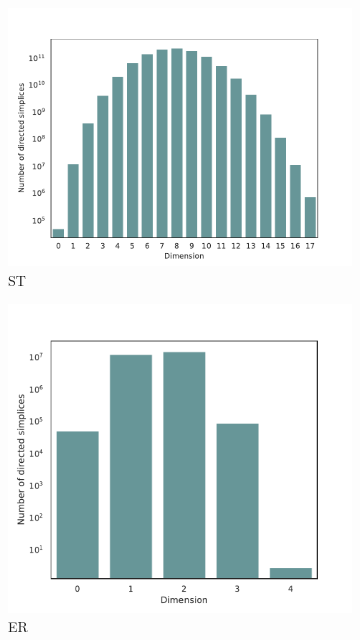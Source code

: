 \begin{figure}[ht]
  \centering
  \begin{subfigure}{.49 \linewidth}
    \includegraphics[scale=0.45]{./counts/real50k_count.pdf}
    \caption{ST}
  \end{subfigure}%
  \begin{subfigure}{.49 \linewidth}
    \includegraphics[scale=0.405]{./counts/random50k.pdf}
    \caption{ER}
  \end{subfigure}
  \begin{subfigure}{.45 \linewidth}

\end{subfigure}
\end{figure}
